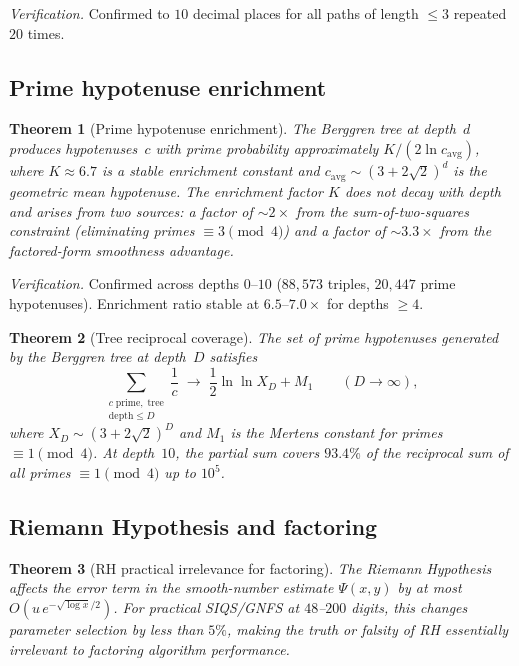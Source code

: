 \documentclass[12pt]{amsart}
\newtheorem{theorem}{Theorem}[section]
\theoremstyle{definition}
\theoremstyle{remark}
\begin{document}
\noindent
\textit{Verification.}  Confirmed to $10$ decimal places for all paths of
length $\le3$ repeated $20$ times.

\subsection{Prime hypotenuse enrichment}

\begin{theorem}[Prime hypotenuse enrichment]\label{thm:prime-enrich}
The Berggren tree at depth~$d$ produces hypotenuses~$c$ with prime probability
approximately $K/(2\ln c_{\mathrm{avg}})$, where $K\approx6.7$ is a stable
enrichment constant and $c_{\mathrm{avg}}\sim(3+2\sqrt{2})^{d}$ is the
geometric mean hypotenuse.  The enrichment factor $K$ does not decay with depth
and arises from two sources: a factor of $\sim2\times$ from the sum-of-two-squares
constraint (eliminating primes $\equiv3\pmod{4}$) and a factor of
$\sim3.3\times$ from the factored-form smoothness advantage.
\end{theorem}

\noindent
\textit{Verification.}  Confirmed across depths $0$--$10$ ($88{,}573$
triples, $20{,}447$ prime hypotenuses).  Enrichment ratio stable at
$6.5$--$7.0\times$ for depths $\ge4$.

\begin{theorem}[Tree reciprocal coverage]\label{thm:recip-cover}
The set of prime hypotenuses generated by the Berggren tree at depth~$D$
satisfies
\[
  \sum_{\substack{c\;\mathrm{prime},\;\mathrm{tree}\\\mathrm{depth}\le D}}
    \frac{1}{c}
  \;\to\;
  \frac{1}{2}\ln\ln X_{D}+M_{1}
  \qquad(D\to\infty),
\]
where $X_{D}\sim(3+2\sqrt{2})^{D}$ and $M_{1}$ is the Mertens constant for
primes $\equiv1\pmod{4}$.  At depth~$10$, the partial sum covers $93.4\%$ of
the reciprocal sum of all primes $\equiv1\pmod{4}$ up to $10^{5}$.
\end{theorem}

\subsection{Riemann Hypothesis and factoring}

\begin{theorem}[RH practical irrelevance for factoring]\label{thm:rh-fact}
The Riemann Hypothesis affects the error term in the smooth-number estimate
$\Psi(x,y)$ by at most $O(u\,e^{-\sqrt{\log x}/2})$.  For practical SIQS/GNFS
at $48$--$200$ digits, this changes parameter selection by less than $5\%$,
making the truth or falsity of RH essentially irrelevant to factoring algorithm
performance.
\end{theorem}
\end{document}
